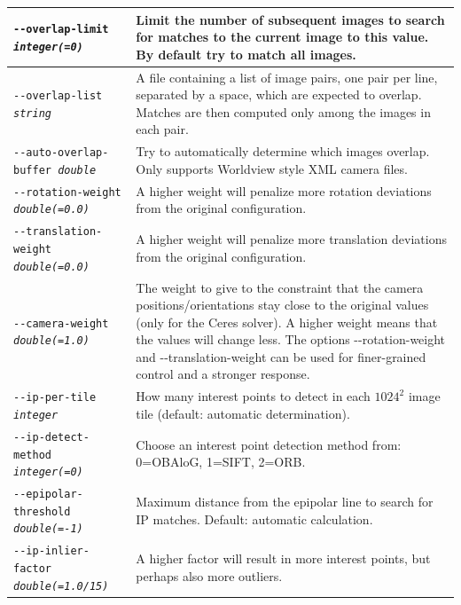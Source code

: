 \begin{longtable}{|p{8cm}|p{9cm}|}
\texttt{-\/-overlap-limit \textit{integer(=0)}} & Limit the number of
subsequent images to search for matches to the current image to this
value.  By default try to match all images.\\ \hline

\texttt{-\/-overlap-list \textit{string}} & A file containing a list of image pairs, one pair per line, separated by a space, which are expected to overlap. Matches are then computed only among the images in each pair.
\\ \hline

\texttt{-\/-auto-overlap-buffer \textit{double}} &
Try to automatically determine which images overlap.  Only supports Worldview style XML camera files.
\\ \hline

\texttt{-\/-rotation-weight \textit{double(=0.0)}} &
A higher weight will penalize more rotation deviations from the original configuration.
\\ \hline

\texttt{-\/-translation-weight \textit{double(=0.0)}} &
A higher weight will penalize more translation deviations from the original configuration.
\\ \hline

\texttt{-\/-camera-weight \textit{double(=1.0)}} &
The weight to give to the constraint that the camera positions/orientations stay close to
the original values (only for the Ceres solver).  A higher weight means that the values will
change less.  The options -\/-rotation-weight and -\/-translation-weight can be used for finer-grained control and a stronger response.
\\ \hline

\texttt{-\/-ip-per-tile \textit{integer}} &
How many interest points to detect in each $1024^2$ image tile (default: automatic
determination).
\\ \hline

\texttt{-\/-ip-detect-method \textit{integer(=0)}} & Choose an interest point
detection method from: 0=OBAloG, 1=SIFT, 2=ORB. \\ \hline

\texttt{-\/-epipolar-threshold \textit{double(=-1)}} & 
Maximum distance from the epipolar line to search for IP matches. Default: automatic calculation.
\\ \hline

\texttt{-\/-ip-inlier-factor \textit{double(=1.0/15)}} & 
A higher factor will result in more interest points, but perhaps also more outliers.
\\ \hline


\end{longtable}
